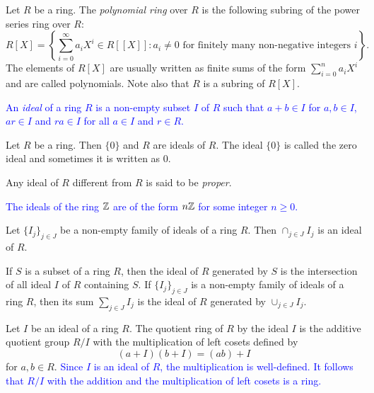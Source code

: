\begin{example}
	Let $R$ be a ring. The {\em polynomial ring} over $R$ is the following subring of the power series ring over $R$:
	\[
	R[X]=\left\{ \sum_{i=0}^{\infty}a_iX^{i}\in R[\![X]\!] : a_i\neq 0 \mbox{ for finitely many non-negative integers } i \right\}.
	\]
	The elements of $R[X]$ are usually written as finite sums of the 
	form $\sum_{i=0}^na_iX^{i}$ and are called polynomials. Note also that $R$ is a subring of $R[X]$.
\end{example}

\textcolor{blue}{
An {\em ideal} of a ring $R$ is a non-empty subset $I$ of $R$ such that
$a+b\in I$ for $a,b\in I$, 
$ar\in I$ and $ra\in I$ for all $a\in I$ and $r\in R$. }

\begin{example}
    Let $R$ be a ring. Then $\{ 0\}$ and $R$ are ideals of $R$. The ideal $\{ 0\}$
    is called the zero ideal and sometimes it is written as $0$.
\end{example}

Any ideal of $R$ different from $R$ is said to be {\em proper}.

\begin{example}
    \textcolor{blue}{The ideals of the ring $\mathbb{Z}$ are of the form $n\mathbb{Z}$ for some integer $n\geq0$.}
\end{example}

\begin{example} 
    Let $\{I_j\}_{j\in J}$ be a non-empty family of ideals of a ring $R$. Then $\cap_{j\in J}I_j$ is an ideal of $R$.
\end{example}

If $S$ is a subset of a ring $R$, then the ideal of $R$ generated by $S$ 
is the intersection of all ideal $I$ of $R$ containing $S$. If
$\{I_j\}_{j\in J}$ is a non-empty family of ideals of a ring $R$, then its sum $\sum_{j\in J}I_j$ is the ideal of $R$ generated by
$\cup_{j\in  J}I_j$.

Let $I$ be an ideal of a ring $R$. The quotient ring of $R$ by the ideal $I$ is the additive quotient group
$R/I$ with the multiplication of left cosets defined by 
\[
(a+I)(b+I)=(ab)+I
\]
for $a,b\in R$. \textcolor{blue}{Since $I$ is an ideal of $R$, the multiplication is well-defined. It follows that 
$R/I$ with the addition and the multiplication of left cosets is a ring.}


